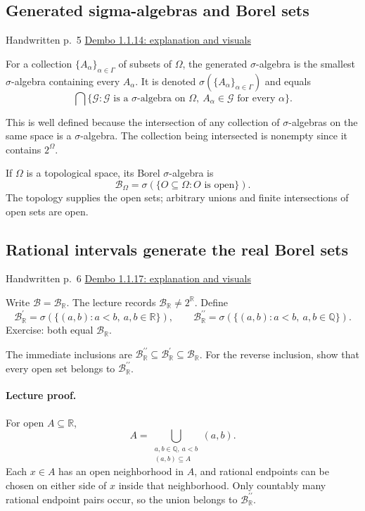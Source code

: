 \documentclass[11pt,letterpaper]{article}
\newcommand{\lecturesection}[1]{\subsection{#1}}
\begin{document}
\hypertarget{l1-s5}{}
\lecturesection{Generated sigma-algebras and Borel sets}
{\small\textcolor{lectureink}{Handwritten p.\ 5} \quad \href{https://josephrbailey.com/probability/\#entry-1-1-14}{Dembo 1.1.14: explanation and visuals}}

For a collection $\{A_\alpha\}_{\alpha\in\Gamma}$ of subsets of $\Omega$, the generated $\sigma$-algebra is the smallest $\sigma$-algebra containing every $A_\alpha$. It is denoted $\sigma(\{A_\alpha\}_{\alpha\in\Gamma})$ and equals \[\bigcap\{\mathcal G:\mathcal G\text{ is a }\sigma\text{-algebra on }\Omega,\ A_\alpha\in\mathcal G\text{ for every }\alpha\}.\]

This is well defined because the intersection of any collection of $\sigma$-algebras on the same space is a $\sigma$-algebra. The collection being intersected is nonempty since it contains $2^\Omega$.

If $\Omega$ is a topological space, its Borel $\sigma$-algebra is \[\mathcal B_\Omega=\sigma(\{O\subseteq\Omega:O\text{ is open}\}).\] The topology supplies the open sets; arbitrary unions and finite intersections of open sets are open.

\hypertarget{l1-s6}{}
\lecturesection{Rational intervals generate the real Borel sets}
{\small\textcolor{lectureink}{Handwritten p.\ 6} \quad \href{https://josephrbailey.com/probability/\#entry-1-1-17}{Dembo 1.1.17: explanation and visuals}}

Write $\mathcal B=\mathcal B_{\mathbb R}$. The lecture records $\mathcal B_{\mathbb R}\ne2^{\mathbb R}$. Define \[\mathcal B_{\mathbb R}^{\prime}=\sigma(\{(a,b):a<b,\ a,b\in\mathbb R\}),\qquad\mathcal B_{\mathbb R}^{\prime\prime}=\sigma(\{(a,b):a<b,\ a,b\in\mathbb Q\}).\] Exercise: both equal $\mathcal B_{\mathbb R}$.

The immediate inclusions are $\mathcal B_{\mathbb R}^{\prime\prime}\subseteq\mathcal B_{\mathbb R}^{\prime}\subseteq\mathcal B_{\mathbb R}$. For the reverse inclusion, show that every open set belongs to $\mathcal B_{\mathbb R}^{\prime\prime}$.

\paragraph{Lecture proof.}
For open $A\subseteq\mathbb R$, \[A=\bigcup_{\substack{a,b\in\mathbb Q,\ a<b\\(a,b)\subseteq A}}(a,b).\] Each $x\in A$ has an open neighborhood in $A$, and rational endpoints can be chosen on either side of $x$ inside that neighborhood. Only countably many rational endpoint pairs occur, so the union belongs to $\mathcal B_{\mathbb R}^{\prime\prime}$.
\end{document}

